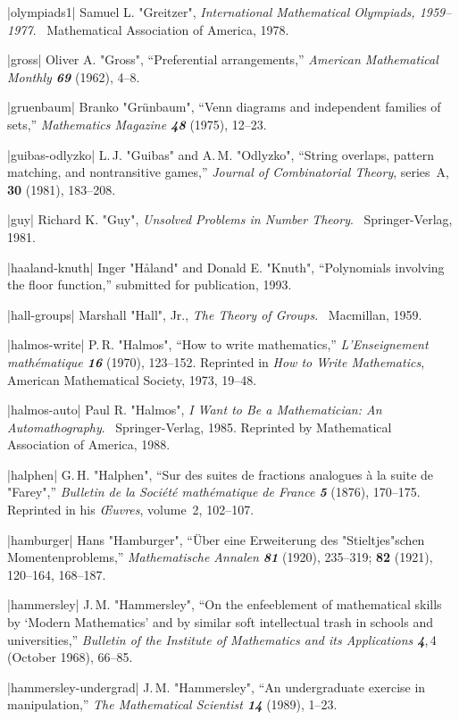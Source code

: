 \bib|olympiads1|%
Samuel L. "Greitzer", {\sl International Mathematical Olympiads, 1959--1977}. \
Mathematical Association of America, 1978.

\bib|gross|%
Oliver A. "Gross", ``Preferential arrangements,''
{\sl American Mathematical Monthly\/ \bf69} (1962), 4--8.

\bib|gruenbaum|%
Branko "Gr\"unbaum", ``Venn diagrams and independent families of sets,''
{\sl Mathematics Magazine\/ \bf48} (1975), 12--23.

\bib|guibas-odlyzko|%
L.\,J. "Guibas" and A.\,M. "Odlyzko", ``String overlaps, pattern matching,
and nontransitive games,'' {\sl Journal of Combinatorial Theory},
series~A, {\bf30} (1981), 183--208.

\bib|guy|%
Richard K. "Guy", {\sl Unsolved Problems in Number Theory}. \
Springer-Verlag, 1981.

\bib|haaland-knuth|%
Inger "H{\aa}land" and Donald E. "Knuth", ``Polynomials involving the
floor function,'' submitted for publication, 1993.

\bib|hall-groups|%
Marshall "Hall", Jr., {\sl The Theory of Groups}. \
Macmillan, 1959.

\bib|halmos-write|%
P.\,R. "Halmos", ``How to write mathematics,''
{\sl L'Enseignement math\'e\-ma\-tique\/ \bf16} (1970), 123--152.
Reprinted in {\sl How to Write Mathematics}, American Mathematical
Society, 1973, 19--48.

\bib|halmos-auto|%
Paul R. "Halmos", {\sl I Want to Be a Mathematician: An Automathography}. \
Springer-Verlag, 1985. Reprinted by Mathematical Association of America, 1988.

\bib|halphen|%
G.\,H. "Halphen", ``Sur des suites de fractions analogues \`a la suite
 de "Farey",''
{\sl Bulletin de la Soci\'et\'e math\'ematique de France\/ \bf5} (1876),
170--175. Reprinted in his {\sl \OE uvres}, volume~2, 102--107.

\bib|hamburger|%
Hans "Hamburger", ``\"Uber eine Erweiterung des "Stieltjes"schen
 Momentenproblems,''
{\sl Mathematische Annalen\/ \bf81} (1920), 235--319; {\bf82} (1921),
120--164, 168--187.

\bib|hammersley|%
J.\,M. "Hammersley", ``On the enfeeblement of mathematical skills
by `Modern Mathematics'
and by similar soft intellectual trash in schools and universities,''
{\sl Bulletin of the Institute of Mathematics and its Applications\/
\bf4},\,4 (October 1968), 66--85.

\bib|hammersley-undergrad|%
J.\,M. "Hammersley", ``An undergraduate exercise in manipulation,''
{\sl The Mathematical Scientist\/ \bf14} (1989), 1--23.

